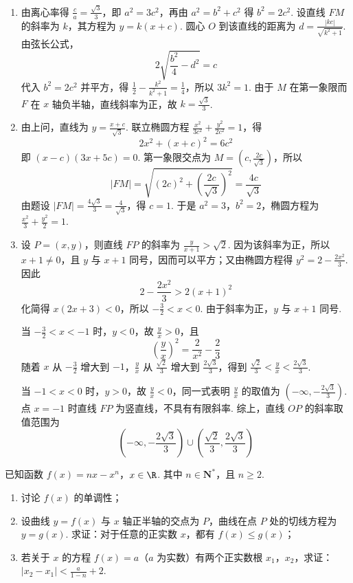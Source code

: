 \begin{solution}
\begin{enumerate}
\item 由离心率得 \(\frac{c}{a}=\frac{\sqrt3}{3}\)，即 \(a^2=3c^2\)，再由 \(a^2=b^2+c^2\) 得 \(b^2=2c^2\). 设直线 \(FM\) 的斜率为 \(k\)，其方程为 \(y=k(x+c)\). 圆心 \(O\) 到该直线的距离为 \(d=\frac{|kc|}{\sqrt{k^2+1}}\). 由弦长公式，
\[
2\sqrt{\frac{b^2}{4}-d^2}=c
\]
代入 \(b^2=2c^2\) 并平方，得 \(\frac12-\frac{k^2}{k^2+1}=\frac14\)，所以 \(3k^2=1\). 由于 \(M\) 在第一象限而 \(F\) 在 \(x\) 轴负半轴，直线斜率为正，故 \(k=\frac{\sqrt3}{3}\).
\item 由上问，直线为 \(y=\frac{x+c}{\sqrt3}\). 联立椭圆方程 \(\frac{x^2}{3c^2}+\frac{y^2}{2c^2}=1\)，得
\[
2x^2+(x+c)^2=6c^2
\]
即 \((x-c)(3x+5c)=0\). 第一象限交点为 \(M=\left(c,\frac{2c}{\sqrt3}\right)\)，所以
\[
|FM|=\sqrt{(2c)^2+\left(\frac{2c}{\sqrt3}\right)^2}=\frac{4c}{\sqrt3}
\]
由题设 \(|FM|=\frac{4\sqrt3}{3}=\frac4{\sqrt3}\)，得 \(c=1\). 于是 \(a^2=3\)，\(b^2=2\)，椭圆方程为 \(\frac{x^2}{3}+\frac{y^2}{2}=1\).
\item 设 \(P=(x,y)\)，则直线 \(FP\) 的斜率为 \(\frac{y}{x+1}>\sqrt2\). 因为该斜率为正，所以 \(x+1\ne0\)，且 \(y\) 与 \(x+1\) 同号，因而可以平方；又由椭圆方程得 \(y^2=2-\frac{2x^2}{3}\). 因此
\[
2-\frac{2x^2}{3}>2(x+1)^2
\]
化简得 \(x(2x+3)<0\)，所以 \(-\frac32<x<0\). 由于斜率为正，\(y\) 与 \(x+1\) 同号.

当 \(-\frac32<x<-1\) 时，\(y<0\)，故 \(\frac yx>0\)，且
\[
\left(\frac yx\right)^2=\frac{2}{x^2}-\frac23
\]
随着 \(x\) 从 \(-\frac32\) 增大到 \(-1\)，\(\frac yx\) 从 \(\frac{\sqrt2}{3}\) 增大到 \(\frac{2\sqrt3}{3}\)，得到 \(\frac{\sqrt2}{3}<\frac yx<\frac{2\sqrt3}{3}\).

当 \(-1<x<0\) 时，\(y>0\)，故 \(\frac yx<0\)，同一式表明 \(\frac yx\) 的取值为 \(\left(-\infty,-\frac{2\sqrt3}{3}\right)\). 点 \(x=-1\) 时直线 \(FP\) 为竖直线，不具有有限斜率. 综上，直线 \(OP\) 的斜率取值范围为
\[
\left(-\infty,-\frac{2\sqrt3}{3}\right)\cup\left(\frac{\sqrt2}{3},\frac{2\sqrt3}{3}\right)
\]
\end{enumerate}
\end{solution}

\begin{problem}
已知函数 \(f(x) = nx - x^n\)，\(x \in \R\). 其中 \( n \in \mathbf{N}^* \)，且 \( n \geqslant 2 \).

\begin{enumerate}
\item 讨论 \( f(x) \) 的单调性；
\item 设曲线 \( y = f(x) \) 与 \( x \) 轴正半轴的交点为 \(P\)，曲线在点 \(P\) 处的切线方程为 \( y = g(x) \). 求证：对于任意的正实数 \( x\)，都有 \( f(x) \leqslant g(x) \)；
\item 若关于 \(x\) 的方程 \(f(x)=a\)（\(a\) 为实数）有两个正实数根 \(x_{1}\)，\(x_{2}\)，求证： \(|x_{2} - x_{1}| < \frac{a}{1 - n} + 2\).
\end{enumerate}
\end{problem}

